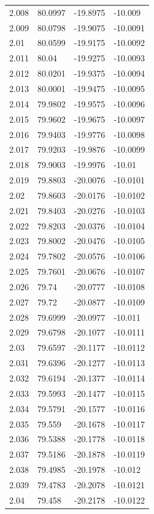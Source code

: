 \begin{tabular}{llll}
2.008 & 80.0997 & -19.8975 & -10.009 \\
2.009 & 80.0798 & -19.9075 & -10.0091 \\
2.01 & 80.0599 & -19.9175 & -10.0092 \\
2.011 & 80.04 & -19.9275 & -10.0093 \\
2.012 & 80.0201 & -19.9375 & -10.0094 \\
2.013 & 80.0001 & -19.9475 & -10.0095 \\
2.014 & 79.9802 & -19.9575 & -10.0096 \\
2.015 & 79.9602 & -19.9675 & -10.0097 \\
2.016 & 79.9403 & -19.9776 & -10.0098 \\
2.017 & 79.9203 & -19.9876 & -10.0099 \\
2.018 & 79.9003 & -19.9976 & -10.01 \\
2.019 & 79.8803 & -20.0076 & -10.0101 \\
2.02 & 79.8603 & -20.0176 & -10.0102 \\
2.021 & 79.8403 & -20.0276 & -10.0103 \\
2.022 & 79.8203 & -20.0376 & -10.0104 \\
2.023 & 79.8002 & -20.0476 & -10.0105 \\
2.024 & 79.7802 & -20.0576 & -10.0106 \\
2.025 & 79.7601 & -20.0676 & -10.0107 \\
2.026 & 79.74 & -20.0777 & -10.0108 \\
2.027 & 79.72 & -20.0877 & -10.0109 \\
2.028 & 79.6999 & -20.0977 & -10.011 \\
2.029 & 79.6798 & -20.1077 & -10.0111 \\
2.03 & 79.6597 & -20.1177 & -10.0112 \\
2.031 & 79.6396 & -20.1277 & -10.0113 \\
2.032 & 79.6194 & -20.1377 & -10.0114 \\
2.033 & 79.5993 & -20.1477 & -10.0115 \\
2.034 & 79.5791 & -20.1577 & -10.0116 \\
2.035 & 79.559 & -20.1678 & -10.0117 \\
2.036 & 79.5388 & -20.1778 & -10.0118 \\
2.037 & 79.5186 & -20.1878 & -10.0119 \\
2.038 & 79.4985 & -20.1978 & -10.012 \\
2.039 & 79.4783 & -20.2078 & -10.0121 \\
2.04 & 79.458 & -20.2178 & -10.0122 \\

\end{tabular}
